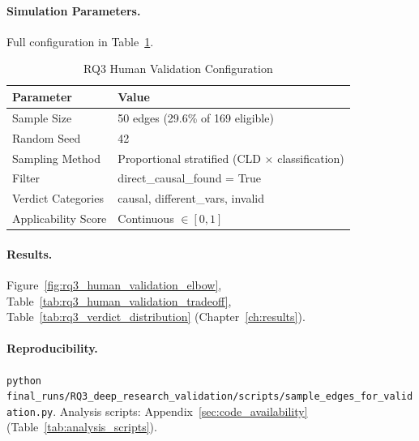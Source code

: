 \paragraph{Simulation Parameters.}
Full configuration in Table~\ref{tab:rq3_human_validation_config}.

\begin{table}[H]
\centering
\caption{RQ3 Human Validation Configuration}
\label{tab:rq3_human_validation_config}
\footnotesize
\begin{tabular}{@{}ll@{}}
\toprule
\textbf{Parameter} & \textbf{Value} \\
\midrule
Sample Size & 50 edges (29.6\% of 169 eligible) \\
Random Seed & 42 \\
Sampling Method & Proportional stratified (CLD $\times$ classification) \\
Filter & direct\_causal\_found = True \\
Verdict Categories & causal, different\_vars, invalid \\
Applicability Score & Continuous $\in [0, 1]$ \\
\bottomrule
\end{tabular}
\end{table}

\paragraph{Results.}
Figure~\ref{fig:rq3_human_validation_elbow}, Table~\ref{tab:rq3_human_validation_tradeoff}, Table~\ref{tab:rq3_verdict_distribution} (Chapter~\ref{ch:results}).

\paragraph{Reproducibility.}
\texttt{python final\_runs/RQ3\_deep\_research\_validation/scripts/sample\_edges\_for\_validation.py}. Analysis scripts: Appendix~\ref{sec:code_availability} (Table~\ref{tab:analysis_scripts}).

